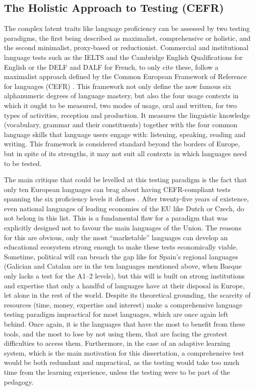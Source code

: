     \subsection{The Holistic Approach to Testing (CEFR)}
The complex latent traits like language proficiency can be assessed by two testing paradigms, the first being described as maximalist, comprehensive or holistic, and the second minimalist, proxy-based or reductionist. Commercial and institutional language tests such as the IELTS and the Cambridge English Qualifications for English or the DELF and DALF for French, to only cite these, follow a maximalist approach defined by the Common European Framework of Reference for languages (CEFR) \parencite{europe_common_2020}. This framework not only define the now famous six alphanumeric degrees of language mastery, but also the four usage contexts in which it ought to be measured, two modes of usage, oral and written, for two types of activities, reception and production. It measures the linguistic knowledge (vocabulary, grammar and their constituents) together with the four common language skills that language users engage with: listening, speaking, reading and writing. This framework is considered standard beyond the borders of Europe, but in spite of its strengths, it may not suit all contexts in which languages need to be tested.

The main critique that could be levelled at this testing paradigm is the fact that only ten European languages can brag about having CEFR-compliant tests spanning the six proficiency levels it defines \parencite{noauthor_common_2025, noauthor_cadre_2025}. After twenty-five years of existence, even national languages of leading economies of the EU like Dutch or Czech, do not belong in this list. This is a fundamental flaw for a paradigm that was explicitly designed not to favour the main languages of the Union. The reasons for this are obvious, only the most ``marketable'' languages can develop an educational ecosystem strong enough to make these tests economically viable. Sometime, political will can breach the gap like for Spain's regional languages (Galician and Catalan are in the ten languages mentioned above, when Basque only lacks a test for the A1–2 levels), but this will is built on strong institutions and expertise that only a handful of languages have at their disposal in Europe, let alone in the rest of the world. Despite its theoretical grounding, the scarcity of resources (time, money, expertise and interest) make a comprehensive language testing paradigm impractical for most languages, which are once again left behind. Once again, it is the languages that have the most to benefit from these tools, and the most to lose by not using them, that are facing the greatest difficulties to access them. Furthermore, in the case of an adaptive learning system, which is the main motivation for this dissertation, a comprehensive test would be both redundant and unpractical, as the testing would take too much time from the learning experience, unless the testing were to be part of the pedagogy.

